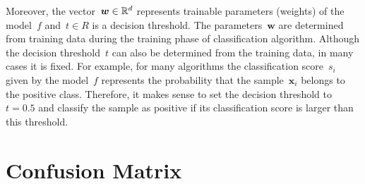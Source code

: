 Moreover, the vector~$\bm{w} \in \mathbb{R}^d$ represents trainable parameters (weights) of the model~$f$ and~$t \in R$ is a decision threshold. The parameters~$\bm{w}$ are determined from training data during the training phase of classification algorithm. Although the decision threshold~$t$ can also be determined from the training data, in many cases it is fixed. For example, for many algorithms the classification score~$s_i$ given by the model~$f$ represents the probability that the sample~$\bm{x}_i$ belongs to the positive class. Therefore, it makes sense to set the decision threshold to~$t = 0.5$ and classify the sample as positive if its classification score is larger than this threshold. 

\section{Confusion Matrix}


